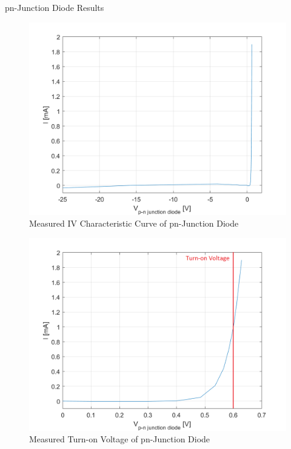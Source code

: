 \FloatBarrier

\begin{table}[h!]
	\centering
	\caption{pn-Junction Diode Results}
	\label{tab:pn-junction-results}
\end{table}

\FloatBarrier

\begin{figure}[h!]
	\centering
	\includegraphics[scale=0.4]{../images/pn_diode.PNG}
	\caption{Measured IV Characteristic Curve of pn-Junction Diode}
	\label{fig:pn_iv_measured}
\end{figure}

\FloatBarrier

\begin{figure}[h!]
	\centering
	\includegraphics[scale=0.8]{../images/pn_diode_turn_on.PNG}
	\caption{Measured Turn-on Voltage of pn-Junction Diode}
	\label{fig:pn_iv_turn_on}
\end{figure}

